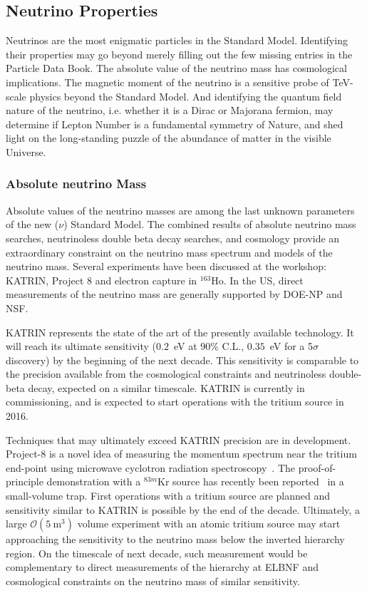 \subsection{Neutrino Properties}
\label{sec:Properties}

Neutrinos are the most enigmatic particles in the Standard
Model. Identifying their properties may go beyond merely filling out
the few missing entries in the Particle Data Book. The absolute value
of the neutrino mass has cosmological implications. The magnetic
moment of the neutrino is a sensitive probe of TeV-scale physics
beyond the Standard Model. And identifying the quantum field nature of
the neutrino, i.e. whether it is a Dirac or Majorana fermion, may
determine if Lepton Number is a fundamental symmetry of Nature, and
shed light on the long-standing puzzle of the abundance of matter in
the visible Universe.

\subsubsection{Absolute neutrino Mass}

Absolute values of the neutrino masses are among the last unknown
parameters of the new ($\nu$) Standard Model. 
The combined results
of absolute neutrino mass searches,
neutrinoless double beta decay searches, and cosmology provide an
extraordinary constraint on the neutrino mass spectrum and models of the
neutrino mass.
Several experiments
have been discussed at the workshop: KATRIN, Project 8 and electron
capture in $^{163}$Ho. In the US, direct measurements of the neutrino
mass are generally supported by DOE-NP and NSF.   

KATRIN represents the state of the art of the presently available
technology. It will reach its ultimate sensitivity ($0.2$~eV at 90\%
C.L., $0.35$~eV for a 5$\sigma$ discovery) by the beginning of the
next decade. This sensitivity is comparable to the precision
available from the cosmological constraints and neutrinoless
double-beta decay, expected on a similar timescale. KATRIN is
currently in commissioning, and is expected to start operations with
the tritium source in 2016.

Techniques that may ultimately exceed KATRIN precision are in
development. Project-8 is a novel idea of measuring the momentum
spectrum near the tritium end-point using microwave cyclotron
radiation spectroscopy~\cite{Monreal:2009za}. The proof-of-principle
demonstration with a $^{83m}$Kr source has recently been
reported~\cite{Asner:2014cwa} in a small-volume trap. First operations
with a tritium source are planned and sensitivity similar to KATRIN is
possible by the end of the decade. Ultimately, a large
$\mathcal{O}(5~\mathrm{m}^3)$ volume experiment with an atomic tritium
source may start approaching the sensitivity to the neutrino mass
below the inverted hierarchy region. On the timescale of next decade,
such measurement would be complementary to direct measurements of the
hierarchy at ELBNF and cosmological constraints on the neutrino mass
of similar sensitivity.


